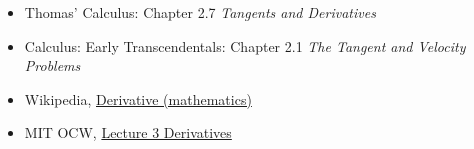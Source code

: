 
\begin{itemize}
\item Thomas' Calculus: Chapter 2.7 {\em Tangents and Derivatives}
\item Calculus: Early Transcendentals: Chapter 2.1 {\em The Tangent and Velocity Problems}
\end{itemize}

\begin{itemize}
\item Wikipedia, \href{http://simple.wikipedia.org/wiki/Derivative_(mathematics)}{Derivative (mathematics)}
\item MIT OCW, \href{http://ocw.mit.edu/courses/mathematics/18-01-single-variable-calculus-fall-2006/video-lectures/lecture-3-derivatives/}{Lecture 3 Derivatives}
\end{itemize}


\newpage

